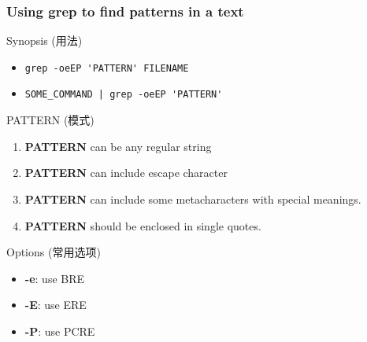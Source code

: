\documentclass[red]{beamer}
\begin{document}
\begin{CJK*}{UTF8}{gbsn}
\begin{frame}
\frametitle{Using grep to find patterns in a text}
\begin{block}{\centering\footnotesize Synopsis (用法)}
\begin{itemize}
	\item \lstinline|grep -oeEP 'PATTERN' FILENAME|
	\item \lstinline{SOME_COMMAND | grep -oeEP 'PATTERN'}
\end{itemize}
\end{block}
\begin{block}{\centering\footnotesize PATTERN (模式)}
\begin{enumerate}
\scriptsize
	\item \textbf{PATTERN} can be any regular string
	\item \textbf{PATTERN} can include escape character
	\item \textbf{PATTERN} can include some metacharacters with 
		special meanings.
	\item \textbf{PATTERN} should be enclosed in single quotes. 
\end{enumerate}
\end{block}
\begin{block}{\centering\footnotesize Options (常用选项)}
\begin{itemize}
\scriptsize
	\item \textbf{-e}: use BRE
	\item \textbf{-E}: use ERE
	\item \textbf{-P}: use PCRE
\end{itemize}
\end{block}
\end{frame}


\end{CJK*}
\end{document}
